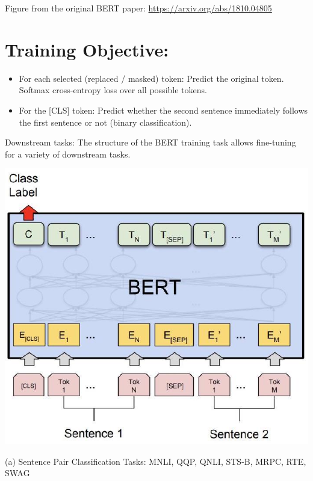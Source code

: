 \documentclass[10pt]{article}
\begin{document}
Figure from the original BERT paper: \href{https://arxiv.org/abs/1810.04805}{https://arxiv.org/abs/1810.04805}

\section*{Training Objective:}
\begin{itemize}
  \item For each selected (replaced / masked) token: Predict the original token. Softmax cross-entropy loss over all possible tokens.
  \item For the [CLS] token: Predict whether the second sentence immediately follows the first sentence or not (binary classification).
\end{itemize}

Downstream tasks: The structure of the BERT training task allows fine-tuning for a variety of downstream tasks.

\begin{center}
\includegraphics[max width=\textwidth]{2024_01_08_7c14f4867d7823fc5a52g-06(3)}
\end{center}

(a) Sentence Pair Classification Tasks: MNLI, QQP, QNLI, STS-B, MRPC, RTE, SWAG
\end{document}
